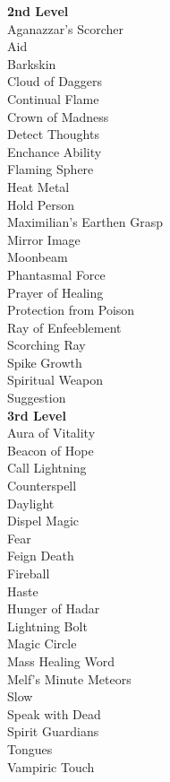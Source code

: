 \newpage
\textbf{2nd Level} \\
 Aganazzar's Scorcher \\
 Aid \\
 Barkskin \\
 Cloud of Daggers \\
 Continual Flame \\
 Crown of Madness \\
 Detect Thoughts \\
 Enchance Ability \\
 Flaming Sphere \\
 Heat Metal \\
 Hold Person \\
 Maximilian's Earthen Grasp \\
 Mirror Image \\
 Moonbeam \\
 Phantasmal Force \\
 Prayer of Healing \\
 Protection from Poison \\
 Ray of Enfeeblement \\
 Scorching Ray \\
 Spike Growth \\
 Spiritual Weapon \\
 Suggestion \\

\textbf{3rd Level} \\
 Aura of Vitality \\
 Beacon of Hope \\
 Call Lightning \\
 Counterspell \\
 Daylight \\
 Dispel Magic \\
 Fear \\
 Feign Death \\
 Fireball \\
 Haste \\
 Hunger of Hadar \\
 Lightning Bolt \\
 Magic Circle \\
 Mass Healing Word \\
 Melf's Minute Meteors \\
 Slow \\
 Speak with Dead \\
 Spirit Guardians \\
 Tongues \\
 Vampiric Touch \\

